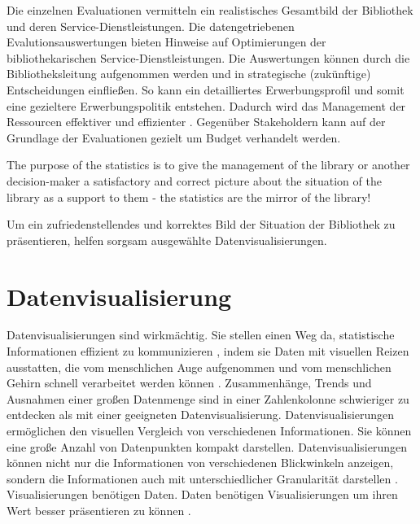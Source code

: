Die einzelnen Evaluationen vermitteln ein realistisches Gesamtbild der Bibliothek und deren Service-Dienstleistungen. 
Die datengetriebenen Evalutionsauswertungen bieten Hinweise auf Optimierungen der bibliothekarischen Service-Dienstleistungen. 
Die Auswertungen können durch die Bibliotheksleitung aufgenommen werden und in strategische (zukünftige) Entscheidungen einfließen. 
So kann ein detailliertes Erwerbungsprofil und somit eine gezieltere Erwerbungspolitik entstehen. 
Dadurch wird das Management der Ressourcen effektiver und effizienter \cite[vgl.][297]{johnson_peggy_fundamentals_2014}.
Gegenüber Stakeholdern kann auf der Grundlage der Evaluationen gezielt um Budget verhandelt werden.
\begin{displayquote}
    The purpose of the statistics is to give the management of the library or another decision-maker 
    a satisfactory and correct picture about the situation of the library as a support to them - the statistics are the mirror of the library!
    \cite[463]{laitinen_markku_library_2013}
\end{displayquote}

Um ein zufriedenstellendes und korrektes Bild der Situation der Bibliothek zu präsentieren, helfen sorgsam ausgewählte Datenvisualisierungen.



\clearpage
\section{Datenvisualisierung}
\label{chap:two_two}
Datenvisualisierungen sind wirkmächtig. Sie stellen einen Weg da, statistische Informationen effizient zu kommunizieren \cite[vgl.][15]{Tufte01}, 
indem sie Daten mit visuellen Reizen ausstatten, die vom menschlichen Auge aufgenommen und vom menschlichen Gehirn schnell verarbeitet werden können \cite[vgl.][32]{few_now_2009}. 
Zusammenhänge, Trends und Ausnahmen einer großen Datenmenge sind in einer Zahlenkolonne schwieriger zu entdecken als mit einer geeigneten Datenvisualisierung.
Datenvisualisierungen ermöglichen den visuellen Vergleich von verschiedenen Informationen. Sie können  eine große Anzahl von Datenpunkten kompakt darstellen. 
Datenvisualisierungen können nicht nur die Informationen von verschiedenen Blickwinkeln anzeigen, sondern die Informationen auch
mit unterschiedlicher Granularität darstellen \cite[vgl.][245]{muller_business_2013}.
Visualisierungen benötigen Daten. Daten benötigen Visualisierungen um ihren Wert besser präsentieren zu können \cite[vgl.][16]{kirk_data_2019}.


